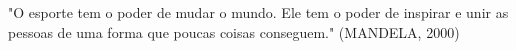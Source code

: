%

\begin{Epigrafe}
"O esporte tem o poder de mudar o mundo. Ele tem o poder de inspirar e unir as pessoas de uma forma que poucas coisas conseguem." (MANDELA, 2000)
\end{Epigrafe}

